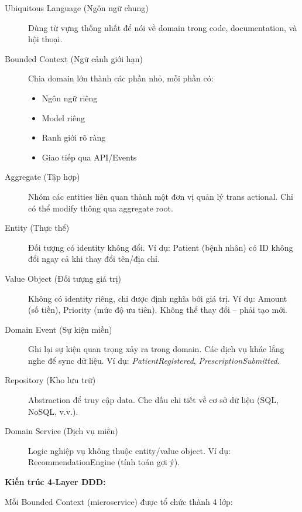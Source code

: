 \documentclass[12pt,a4paper]{article}
\begin{document}
\begin{description}
    \item[Ubiquitous Language (Ngôn ngữ chung)] Dùng từ vựng thống nhất để nói về domain trong code, documentation, và hội thoại.
    
    \item[Bounded Context (Ngữ cảnh giới hạn)] Chia domain lớn thành các phần nhỏ, mỗi phần có:
    \begin{itemize}
        \item Ngôn ngữ riêng
        \item Model riêng
        \item Ranh giới rõ ràng
        \item Giao tiếp qua API/Events
    \end{itemize}
    
    \item[Aggregate (Tập hợp)] Nhóm các entities liên quan thành một đơn vị quản lý trans actional. Chỉ có thể modify thông qua aggregate root.
    
    \item[Entity (Thực thể)] Đối tượng có identity không đổi. Ví dụ: Patient (bệnh nhân) có ID không đổi ngay cả khi thay đổi tên/địa chỉ.
    
    \item[Value Object (Đối tượng giá trị)] Không có identity riêng, chỉ được định nghĩa bởi giá trị. Ví dụ: Amount (số tiền), Priority (mức độ ưu tiên). Không thể thay đổi – phải tạo mới.
    
    \item[Domain Event (Sự kiện miền)] Ghi lại sự kiện quan trọng xảy ra trong domain. Các dịch vụ khác lắng nghe để sync dữ liệu. Ví dụ: \textit{PatientRegistered}, \textit{PrescriptionSubmitted}.
    
    \item[Repository (Kho lưu trữ)] Abstraction để truy cập data. Che dấu chi tiết về cơ sở dữ liệu (SQL, NoSQL, v.v.).
    
    \item[Domain Service (Dịch vụ miền)] Logic nghiệp vụ không thuộc entity/value object. Ví dụ: RecommendationEngine (tính toán gợi ý).
\end{description}

\textbf{Kiến trúc 4-Layer DDD:}

Mỗi Bounded Context (microservice) được tổ chức thành 4 lớp:
\end{document}
